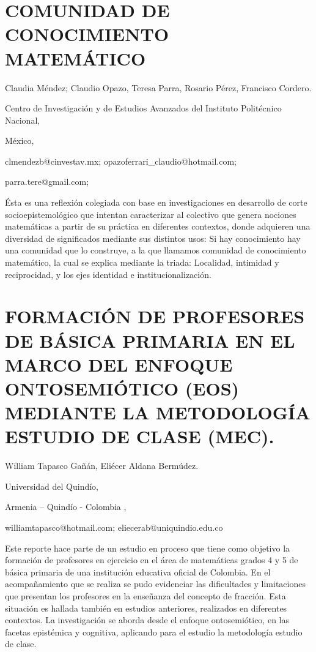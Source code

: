 \section{COMUNIDAD DE CONOCIMIENTO MATEMÁTICO}

\begin{datos}

Claudia Méndez; Claudio Opazo, Teresa Parra, Rosario Pérez, Francisco
Cordero. 

Centro de Investigación y de Estudios Avanzados del Instituto Politécnico
Nacional,

México,

clmendezb@cinvestav.mx; opazoferrari\_claudio@hotmail.com; 

parra.tere@gmail.com;

\end{datos}

Ésta es una reflexión colegiada con base en investigaciones en desarrollo
de corte socioepistemológico que intentan caracterizar al colectivo
que genera nociones matemáticas a partir de su práctica en diferentes
contextos, donde adquieren una diversidad de significados mediante
sus distintos usos: Si hay conocimiento hay una comunidad que lo construye,
a la que llamamos comunidad de conocimiento matemático, la cual se
explica mediante la triada: Localidad, intimidad y reciprocidad, y
los ejes identidad e institucionalización.


\section{FORMACIÓN DE PROFESORES DE BÁSICA PRIMARIA EN EL MARCO DEL ENFOQUE
ONTOSEMIÓTICO (EOS) MEDIANTE LA METODOLOGÍA ESTUDIO DE CLASE (MEC).}

\begin{datos}

William Tapasco Gañán, Eliécer Aldana Bermúdez.

Universidad del Quindío,

Armenia – Quindío - Colombia ,

williamtapasco@hotmail.com; eliecerab@uniquindio.edu.co

\end{datos}

Este reporte hace parte de un estudio en proceso que tiene como objetivo
la formación de profesores en ejercicio en el área de matemáticas
grados 4\textdegree{} y 5\textdegree{} de básica primaria de una institución
educativa oficial de Colombia. En el acompañamiento que se realiza
se pudo evidenciar las dificultades y limitaciones que presentan los
profesores en la enseñanza del concepto de fracción. Esta situación
es hallada también en estudios anteriores, realizados en diferentes
contextos. La investigación se aborda desde el enfoque ontosemiótico,
en las facetas epistémica y cognitiva, aplicando para el estudio la
metodología estudio de clase. 



